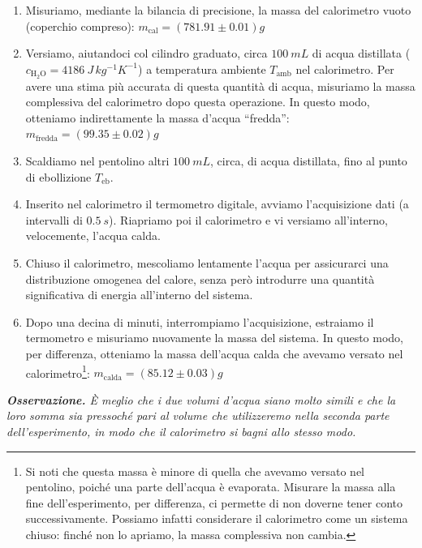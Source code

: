 \documentclass{article}
\begin{document}
\begin{enumerate}
    \item
        Misuriamo, mediante la bilancia di precisione, la massa del
        calorimetro vuoto (coperchio compreso):
        $m_\text{cal} = \left(781.91\pm0.01\right) \unit{g}$
    \item
        Versiamo, aiutandoci col cilindro graduato, circa $\qty{100}{mL}$
        di acqua distillata ($c_{\text{H}_2\text{O}}=\qty{4186}{J\,kg^{-1}K^{-1}}$)
        a temperatura ambiente $T_\text{amb}$ nel calorimetro.
        Per avere una stima più accurata di questa quantità di acqua,
        misuriamo la massa complessiva del calorimetro dopo questa operazione.
        In questo modo, otteniamo indirettamente la massa d'acqua “fredda”:
        $m_\text{fredda} = \left(99.35\pm0.02\right) \unit{g}$
    \item
        Scaldiamo nel pentolino altri $\qty{100}{mL}$, circa, di acqua distillata,
        fino al punto di ebollizione $T_\text{eb}$.
    \item
        Inserito nel calorimetro il termometro digitale, avviamo l'acquisizione dati
        (a intervalli di $\qty{0.5}{s}$).
        Riapriamo poi il calorimetro e vi versiamo all'interno,
        velocemente, l'acqua calda.
    \item
        Chiuso il calorimetro, mescoliamo lentamente l'acqua per assicurarci
        una distribuzione omogenea del calore, senza però introdurre una quantità
        significativa di energia all'interno del sistema.
    \item
        Dopo una decina di minuti, interrompiamo l'acquisizione, estraiamo il
        termometro e misuriamo nuovamente la massa del sistema.
        In questo modo, per differenza, otteniamo la massa dell'acqua calda che
        avevamo versato nel calorimetro\footnote{
        Si noti che questa massa è minore di quella che avevamo versato
        nel pentolino, poiché una parte dell'acqua è evaporata. Misurare la massa
        alla fine dell'esperimento, per differenza, ci permette di non doverne
        tener conto successivamente. Possiamo infatti considerare il calorimetro
        come un sistema chiuso: finché non lo apriamo, la massa complessiva
        non cambia.
        }:
        $m_\text{calda} = \left(85.12\pm0.03\right) \unit{g}$
\end{enumerate}

\emph{
\textbf{Osservazione.} È meglio che i due volumi d'acqua siano molto simili e che
la loro somma sia pressoché pari al volume che utilizzeremo nella seconda parte
dell'esperimento, in modo che il calorimetro si bagni allo stesso modo.
}
\end{document}
